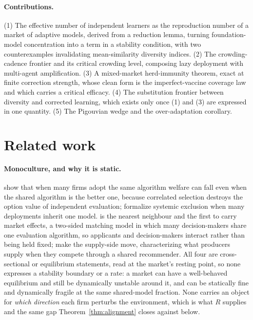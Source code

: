 \documentclass{article}
\theoremstyle{plain}
\theoremstyle{definition}
\begin{document}
\paragraph{Contributions.}
(1) The effective number of independent learners as the reproduction number of a market of adaptive models, derived from a reduction lemma, turning foundation-model concentration into a term in a stability condition, with two counterexamples invalidating mean-similarity diversity indices. (2) The crowding-cadence frontier and its critical crowding level, composing lazy deployment with multi-agent amplification. (3) A mixed-market herd-immunity theorem, exact at finite correction strength, whose clean form is the imperfect-vaccine coverage law and which carries a critical efficacy. (4) The substitution frontier between diversity and corrected learning, which exists only once (1) and (3) are expressed in one quantity. (5) The Pigouvian wedge and the over-adaptation corollary.

\section{Related work}

\paragraph{Monoculture, and why it is static.}
\citet{kleinberg2021} show that when many firms adopt the same algorithm welfare can fall even when the shared algorithm is the better one, because correlated selection destroys the option value of independent evaluation; \citet{bommasani2022} formalize systemic exclusion when many deployments inherit one model. \citet{peng2024} is the nearest neighbour and the first to carry market effects, a two-sided matching model in which many decision-makers share one evaluation algorithm, so applicants and decision-makers interact rather than being held fixed; \citet{jagadeesan2023} make the supply-side move, characterizing what producers supply when they compete through a shared recommender. All four are cross-sectional or equilibrium statements, read at the market's resting point, so none expresses a stability boundary or a rate: a market can have a well-behaved equilibrium and still be dynamically unstable around it, and can be statically fine and dynamically fragile at the same shared-model fraction. None carries an object for \emph{which direction} each firm perturbs the environment, which is what $R$ supplies and the same gap Theorem~\ref{thm:alignment} closes against \citet{narang2023} below.
\end{document}

